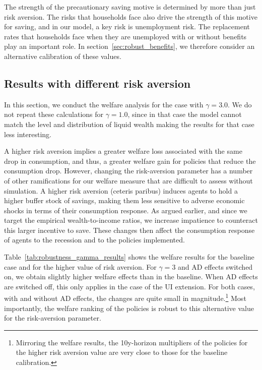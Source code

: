 \documentclass{econsocart}
\begin{document}
The strength of the precautionary saving motive is determined by more than just risk aversion.
The risks that households face also drive the strength of this motive for saving, and in our model, a key risk is unemployment risk.
The replacement rates that households face when they are unemployed with or without benefits play an important role.
In section~\ref{sec:robust_benefits}, we therefore consider an alternative calibration of these values.

\subsection*{Results with different risk aversion}
\whenintegrated{\label{sec:robust_gamma_results}} %

In this section, we conduct the welfare analysis for the case with $\gamma=3.0$.
We do not repeat these calculations for $\gamma=1.0$, since in that case the model cannot match the level and distribution of liquid wealth making the results for that case less interesting.

A higher risk aversion implies a greater welfare loss associated with the same drop in consumption, and thus, a greater welfare gain for policies that reduce the consumption drop.
However, changing the risk-aversion parameter has a number of other ramifications for our welfare measure that are difficult to assess without simulation.
A higher risk aversion (ceteris paribus) induces agents to hold a higher buffer stock of savings, making them less sensitive to adverse economic shocks in terms of their consumption response.
As argued earlier, and since we target the empirical wealth-to-income ratios, we increase impatience to counteract this larger incentive to save.
These changes then affect the consumption response of agents to the recession and to the policies implemented.

Table~\ref{tab:robustness_gamma_results} shows the welfare results for the baseline case and for the higher value of risk aversion.
For $\gamma=3$ and AD effects switched on, we obtain slightly higher welfare effects than in the baseline.
When AD effects are switched off, this only applies in the case of the UI extension.
For both cases, with and without AD effects, the changes are quite small in magnitude.\footnote{Mirroring the welfare results, the 10y-horizon multipliers of the policies for the higher risk aversion value are very close to those for the baseline calibration.} Most importantly, the welfare ranking of the policies is robust to this alternative value for the risk-aversion parameter.
\end{document}
